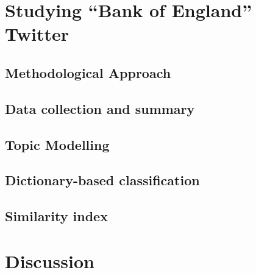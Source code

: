 \documentclass[11pt]{article}
\begin{document}
\section{Studying ``Bank of England'' Twitter} \label{Section: Studying ``Bank of England'' Twitter}

\subsection{Methodological Approach} \label{Subsection: Methodological Approach}
\subsection{Data collection and summary} \label{Subsection: Data collection and summary}
\subsection{Topic Modelling} \label{Subsection: Topic Modelling}
\subsection{Dictionary-based classification} \label{Subsection: Dictionary-based classification}
\subsection{Similarity index} \label{Subsection: Similarity index}

\section{Discussion} \label{Section: Discussion}

\clearpage

\end{document}

